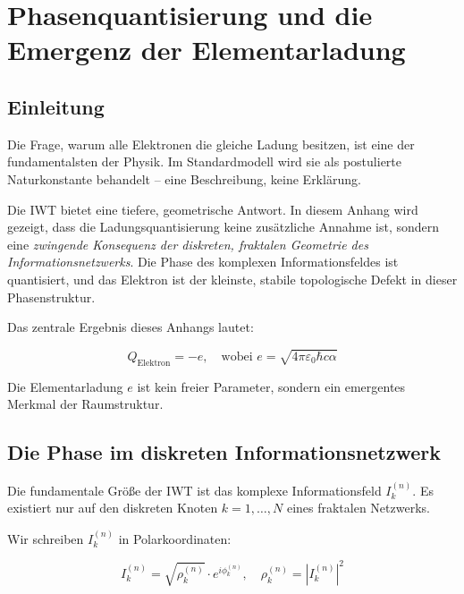 
\chapter{Phasenquantisierung und die Emergenz der Elementarladung}
\label{app:phasenquantisierung}

\section{Einleitung}
\label{app:phasenquantisierung_einleitung}

Die Frage, warum alle Elektronen die gleiche Ladung besitzen, ist eine der fundamentalsten der Physik. Im Standardmodell wird sie als postulierte Naturkonstante behandelt – eine Beschreibung, keine Erklärung.

Die IWT bietet eine tiefere, geometrische Antwort. In diesem Anhang wird gezeigt, dass die Ladungsquantisierung keine zusätzliche Annahme ist, sondern eine \emph{zwingende Konsequenz der diskreten, fraktalen Geometrie des Informationsnetzwerks}. Die Phase des komplexen Informationsfeldes ist quantisiert, und das Elektron ist der kleinste, stabile topologische Defekt in dieser Phasenstruktur.

Das zentrale Ergebnis dieses Anhangs lautet:

\[
\boxed{Q_{\text{Elektron}} = -e, \quad \text{wobei } e = \sqrt{4\pi\varepsilon_0 \hbar c \alpha}}
\]

Die Elementarladung \( e \) ist kein freier Parameter, sondern ein emergentes Merkmal der Raumstruktur.

\section{Die Phase im diskreten Informationsnetzwerk}
\label{app:phasenquantisierung_phase}

Die fundamentale Größe der IWT ist das komplexe Informationsfeld \( I_k^{(n)} \). Es existiert nur auf den diskreten Knoten \( k = 1, \dots, N \) eines fraktalen Netzwerks.

Wir schreiben \( I_k^{(n)} \) in Polarkoordinaten:

\[
I_k^{(n)} = \sqrt{\rho_k^{(n)}} \cdot e^{i\phi_k^{(n)}}, \quad \rho_k^{(n)} = |I_k^{(n)}|^2
\]

